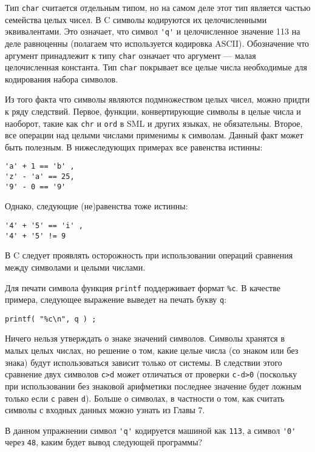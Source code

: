 Тип \lstinline|char| считается отдельным типом, но на самом деле этот тип является частью семейства целых чисел. В C символы кодируются их целочисленными эквивалентами. Это означает, что символ \lstinline|'q'| и целочисленное значение 113 на деле равноценны (полагаем что используется кодировка ASCII). Обозначение что аргумент принадлежит к типу \lstinline|char| означает что аргумент --- малая целочисленная константа. Тип \lstinline|char| покрывает все целые числа необходимые для кодирования набора символов.

Из того факта что символы являются подмножеством целых чисел, можно придти к ряду следствий. Первое, функции, конвертирующие символы в целые числа и наоборот, такие как \lstinline|chr| и \lstinline|ord| в SML и других языках, не обязательны. Второе, все операции над целыми числами применимы к символам. Данный факт может быть полезным. В нижеследующих примерах все равенства истинны:

\begin{lstlisting}
'a' + 1 == 'b' ,
'z' - 'a' == 25,
'9' - 0 == '9'
\end{lstlisting}

Однако, следующие (не)равенства тоже истинны:

\begin{lstlisting}
'4' + '5' == 'i' ,
'4' + '5' != 9
\end{lstlisting}

В C следует проявлять осторожность при использовании операций сравнения между символами и целыми числами.

Для печати символа функция \lstinline|printf| поддерживает формат \lstinline|%c|. В качестве примера, следующее выражение выведет на печать букву \lstinline|q|:

\begin{lstlisting}
printf( "%c\n", q ) ;
\end{lstlisting}

Ничего нельзя утверждать о знаке значений символов. Символы хранятся в малых целых числах, но решение о том, какие целые числа (со знаком или без знака) будут использоваться зависит только от системы. В следствии этого сравнение двух символов \lstinline|c>d| может отличаться от проверки \lstinline|c-d>0| (поскольку при использовании без знаковой арифметики последнее значение будет ложным только если \lstinline|c| равен \lstinline|d|). Больше о символах, в частности о том, как считать символы с входных данных можно узнать из Главы 7.

\exercise В данном упражнении символ \lstinline|'q'| кодируется машиной как \lstinline|113|, а символ \lstinline|'0'| через \lstinline|48|, каким будет вывод следующей программы?\label{ex_2.5}

